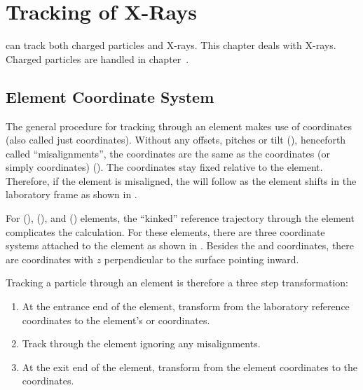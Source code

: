 \chapter{Tracking of X-Rays}
\label{c:xray.track}

\bmad can track both charged particles and X-rays. This chapter deals
with X-rays. Charged particles are handled in chapter~.

\section{Element Coordinate System}
\label{s:photon.ele.coords}

The general procedure for tracking through an element makes use of
 coordinates (also called just 
coordinates). Without any offsets, pitches or tilt (), henceforth
called ``misalignments'', the  coordinates are the same
as the  coordinates (or simply 
coordinates) (). The  coordinates stay fixed
relative to the element. Therefore, if the element is misaligned, the
 will follow as the element shifts in the
laboratory frame as shown in .

For  (),  (),
and  () elements, the
``kinked'' reference trajectory through the element complicates the
calculation. For these elements, there are three coordinate systems
attached to the element as shown in . Besides
the  and  coordinates, there are
 coordinates with $z$ perpendicular to the surface
pointing inward.

Tracking a particle through an element is therefore a three
step transformation:
\begin{enumerate}
\item
At the entrance end of the element, transform from the laboratory
reference coordinates to the element's  or 
coordinates.
\item
Track through the element ignoring any misalignments.
\item
At the exit end of the element, transform from the element coordinates
to the   coordinates.
\end{enumerate}


